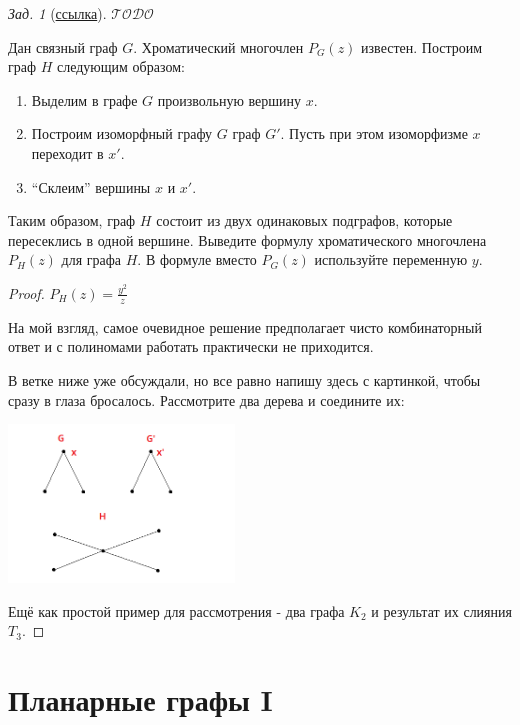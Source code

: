 \documentclass[a4paper,12pt]{article}
\numberwithin{figure}{section}
\theoremstyle{remark}
\newtheorem{problem}{Зад.}[section]
\def\iiTODO{\guillemotleft$\mathcal{TODO}$\guillemotright\textellipsis}
\begin{document}
\begin{problem}[\href{https://stepik.org/lesson/12299/step/9}{ссылка}]

	\iiTODO

	Дан связный граф $G$. Хроматический многочлен $P_G(z)$ известен. Построим граф $H$ следующим образом:
	\begin{enumerate}
		\item Выделим в графе $G$ произвольную вершину $x$.
		\item Построим изоморфный графу $G$ граф $G'$. Пусть при этом изоморфизме $x$ переходит в $x'$.
		\item ``Склеим'' вершины $x$ и $x'$.
	\end{enumerate}
	Таким образом, граф $H$ состоит из двух одинаковых подграфов, которые пересеклись в одной вершине. Выведите формулу хроматического многочлена $P_H(z)$ для графа $H$. В формуле вместо $P_G(z)$ используйте переменную $y$.
\end{problem}
\begin{proof}
	$\displaystyle P_H(z)=\frac{y^2}{z}$
	
	На мой взгляд, самое очевидное решение предполагает чисто комбинаторный ответ и с полиномами работать  практически не приходится.
	
	В ветке ниже уже обсуждали, но все равно напишу здесь с картинкой, чтобы сразу в глаза бросалось. Рассмотрите два дерева и соедините их:
	
	\includegraphics[width=6cm]{chromatic-number-after-merge.png}
	
	Ещё как простой пример для рассмотрения - два графа $K_2$ и результат их слияния $T_3$.
\end{proof}



\section{Планарные графы I}
\end{document}

